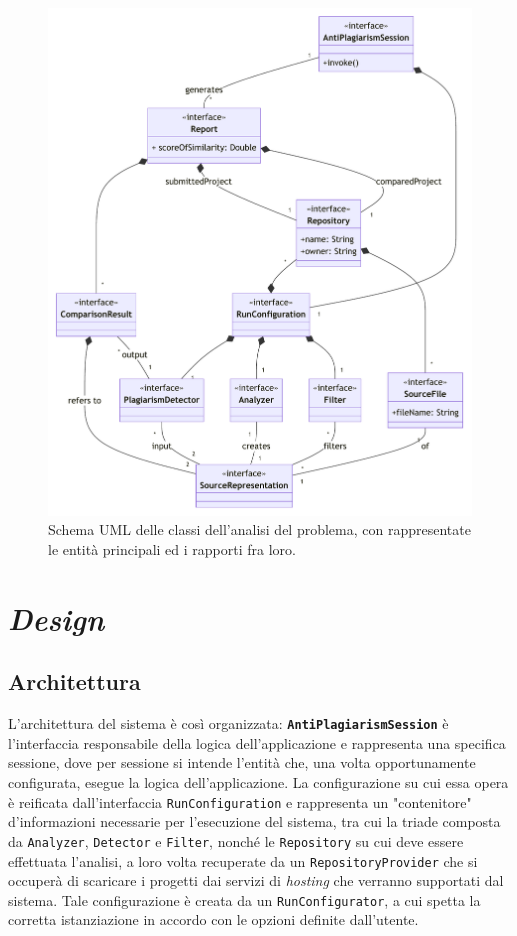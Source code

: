 \begin{figure}[h!]
    \centering
    \includegraphics[width=\textwidth]{resources/img/02-domain.pdf}
    \caption{Schema UML delle classi dell'analisi del problema, con rappresentate le entità principali ed i rapporti fra loro.}
    \label{img:02-domain}
\end{figure}

\section{\textit{Design}}

\subsection{Architettura}
\label{02-architecture}
L'architettura del sistema è così organizzata: \textbf{\texttt{AntiPlagiarismSession}} è l'interfaccia responsabile della logica dell'applicazione e rappresenta una specifica sessione, dove per sessione si intende l'entità che, una volta opportunamente configurata, esegue la logica dell'applicazione.
%
La configurazione su cui essa opera è reificata dall'interfaccia \texttt{RunConfiguration} e rappresenta un "contenitore" d'informazioni necessarie per l'esecuzione del sistema, tra cui la triade composta da \texttt{Analyzer}, \texttt{Detector} e \texttt{Filter}, nonché le \texttt{Repository} su cui deve essere effettuata l'analisi, a loro volta recuperate da un \texttt{RepositoryProvider} che si occuperà di scaricare i progetti dai servizi di \textit{hosting} che verranno supportati dal sistema.
%
Tale configurazione è creata da un \texttt{RunConfigurator}, a cui spetta la corretta istanziazione in accordo con le opzioni definite dall'utente.

